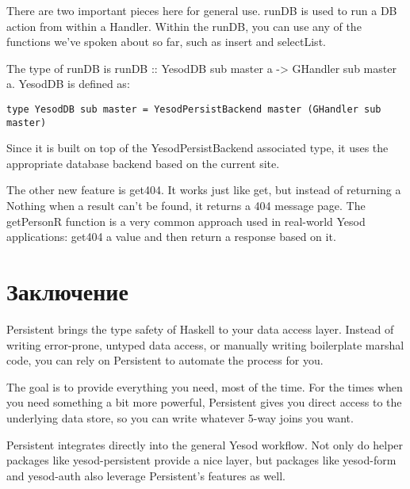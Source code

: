 There are two important pieces here for general use. runDB is used to run a DB action from within a Handler. Within the runDB, you can use any of the functions we've spoken about so far, such as insert and selectList.

\begin{remark}
The type of runDB is runDB :: YesodDB sub master a -> GHandler sub master a. YesodDB is defined as:

\begin{lstlisting}
type YesodDB sub master = YesodPersistBackend master (GHandler sub master)
\end{lstlisting}

Since it is built on top of the YesodPersistBackend associated type, it uses the appropriate database backend based on the current site.
\end{remark}

The other new feature is get404. It works just like get, but instead of returning a Nothing when a result can't be found, it returns a 404 message page. The getPersonR function is a very common approach used in real-world Yesod applications: get404 a value and then return a response based on it.

\section{Заключение} %

Persistent brings the type safety of Haskell to your data access layer. Instead of writing error-prone, untyped data access, or manually writing boilerplate marshal code, you can rely on Persistent to automate the process for you.

The goal is to provide everything you need, most of the time. For the times when you need something a bit more powerful, Persistent gives you direct access to the underlying data store, so you can write whatever 5-way joins you want.

Persistent integrates directly into the general Yesod workflow. Not only do helper packages like yesod-persistent provide a nice layer, but packages like yesod-form and yesod-auth also leverage Persistent's features as well.
